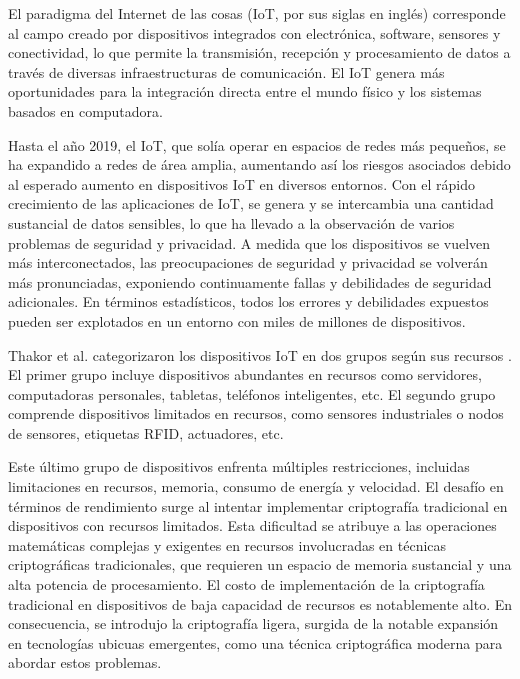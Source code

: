 \documentclass[conference]{IEEEtran}
\begin{document}
El paradigma del Internet de las cosas (IoT, por sus siglas en inglés) corresponde al campo creado por dispositivos integrados con electrónica, software, sensores y conectividad, lo que permite la transmisión, recepción y procesamiento de datos a través de diversas infraestructuras de comunicación. El IoT genera más oportunidades para la integración directa entre el mundo físico y los sistemas basados en computadora.

Hasta el año 2019, el IoT, que solía operar en espacios de redes más pequeños, se ha expandido a redes de área amplia, aumentando así los riesgos asociados debido al esperado aumento en dispositivos IoT en diversos entornos. Con el rápido crecimiento de las aplicaciones de IoT, se genera y se intercambia una cantidad sustancial de datos sensibles, lo que ha llevado a la observación de varios problemas de seguridad y privacidad. A medida que los dispositivos se vuelven más interconectados, las preocupaciones de seguridad y privacidad se volverán más pronunciadas, exponiendo continuamente fallas y debilidades de seguridad adicionales. En términos estadísticos, todos los errores y debilidades expuestos pueden ser explotados en un entorno con miles de millones de dispositivos.

Thakor et al. categorizaron los dispositivos IoT en dos grupos según sus recursos \cite{IoT_1}. El primer grupo incluye dispositivos abundantes en recursos como servidores, computadoras personales, tabletas, teléfonos inteligentes, etc. El segundo grupo comprende dispositivos limitados en recursos, como sensores industriales o nodos de sensores, etiquetas RFID, actuadores, etc.

Este último grupo de dispositivos enfrenta múltiples restricciones, incluidas limitaciones en recursos, memoria, consumo de energía y velocidad. El desafío en términos de rendimiento surge al intentar implementar criptografía tradicional en dispositivos con recursos limitados. Esta dificultad se atribuye a las operaciones matemáticas complejas y exigentes en recursos involucradas en técnicas criptográficas tradicionales, que requieren un espacio de memoria sustancial y una alta potencia de procesamiento. El costo de implementación de la criptografía tradicional en dispositivos de baja capacidad de recursos es notablemente alto. En consecuencia, se introdujo la criptografía ligera, surgida de la notable expansión en tecnologías ubicuas emergentes, como una técnica criptográfica moderna para abordar estos problemas.
\end{document}
